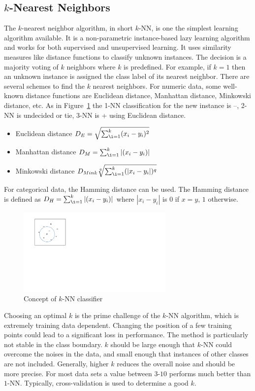 \subsection*{$k$-Nearest Neighbors}
The $k$-nearest neighbor algorithm, in short $k$-NN, is one the simplest learning algorithm available. It is a non-parametric instance-based lazy learning algorithm and works for both supervised and unsupervised learning. It uses similarity measures like distance functions to classify unknown instances. The decision is a majority voting of  $k$ neighbors where $k$ is predefined. For example, if $k= 1$ then an unknown instance is assigned the class label of its nearest neighbor. There are several schemes to find the $k$ nearest neighbors. For numeric data, some well-known distance functions are Euclidean distance, Manhattan distance, Minkowski distance, etc.  As in Figure~\ref{fig:bg:knn} the 1-NN classification for the new instance is {--}, 2-NN is undecided or tie, 3-NN is {+} using Euclidean distance.
\begin{itemize}
    \item Euclidean distance $D_E = \sqrt{\sum_{\i =1 }^{k} (x_i - y_i)^2}$
    \item Manhattan distance $D_M = \sum_{\i =1 }^{k} |(x_i - y_i)|$
    \item Minkowski distance $D_{Mink}\sqrt[q]{\sum_{\i =1 }^{k} (|x_i - y_i|)^q}$
\end{itemize}
For categorical data, the Hamming distance can be used. The Hamming distance is defined as $D_H = \sum_{\i =1 }^{k} |(x_i - y_i)|$ where $|x_i - y_i|$ is $0$ if $x=y$, $1$ otherwise.

\begin{figure}[htbp]
    \begin{center}
        \includegraphics[width=3.0in]{figs/knn.pdf}
        \caption{Concept of $k$-NN classifier}
        \label{fig:bg:knn}
    \end{center}
\end{figure}

Choosing an optimal $k$ is the prime challenge of the $k$-NN algorithm, which is extremely training data dependent. Changing the position of a few training points could lead to a significant loss in performance. The method is particularly not stable in the class boundary. $k$ should be large enough that $k$-NN could overcome the noises in the data, and small enough that instances of other classes are not included. Generally, higher $k$ reduces the overall noise and should be more precise. For most data sets a value between $3$-$10$ performs much better than $1$-NN. Typically, cross-validation is used to determine a good $k$. 

